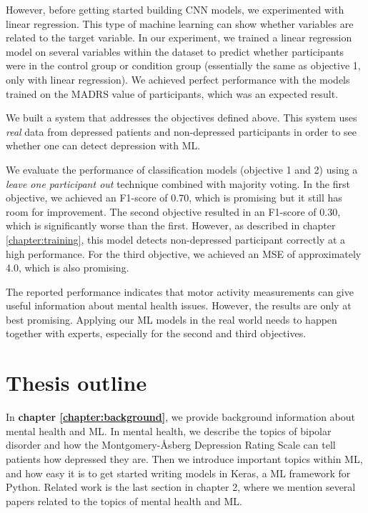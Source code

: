 However, before getting started building CNN models, we experimented with linear regression. This type of machine learning can show whether variables are related to the target variable. In our experiment, we trained a linear regression model on several variables within the dataset to predict whether participants were in the control group or condition group (essentially the same as objective 1, only with linear regression). We achieved perfect performance with the models trained on the MADRS value of participants, which was an expected result.

We built a system that addresses the objectives defined above. This system uses \textit{real} data from depressed patients and non-depressed participants in order to see whether one can detect depression with ML.

We evaluate the performance of classification models (objective 1 and 2) using a \textit{leave one participant out} technique combined with majority voting. In the first objective, we achieved an F1-score of 0.70, which is promising but it still has room for improvement. The second objective resulted in an F1-score of 0.30, which is significantly worse than the first. However, as described in chapter \ref{chapter:training}, this model detects non-depressed participant correctly at a high performance. For the third objective, we achieved an MSE of approximately 4.0, which is also promising. 

The reported performance indicates that motor activity measurements can give useful information about mental health issues. However, the results are only at best promising. Applying our ML models in the real world needs to happen together with experts, especially for the second and third objectives. 

\newpage

\section{Thesis outline}
In \textbf{chapter \ref{chapter:background}}, we provide background information about mental health and ML. In mental health, we describe the topics of bipolar disorder and how the Montgomery-Åsberg Depression Rating Scale can tell patients how depressed they are. Then we introduce important topics within ML, and how easy it is to get started writing models in Keras, a ML framework for Python. Related work is the last section in chapter 2, where we mention several papers related to the topics of mental health and ML. \\

